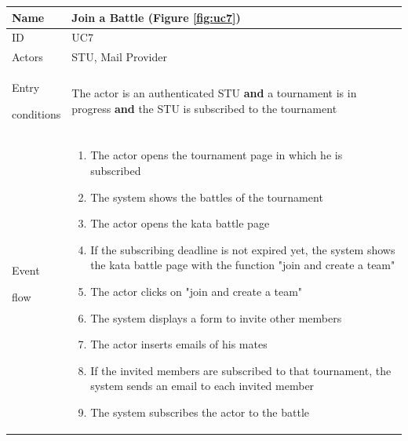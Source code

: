 \begin{center}
    \def\arraystretch{1.5}
    \begin{tabular}{| m{2cm} | m{10cm}|}
        \hline
        Name                  & Join a Battle (Figure \ref{fig:uc7})                                                                                                                             \\ \hline
        ID                    & UC7                                                                                                                                         \\ \hline
        Actors                & STU, Mail Provider                                                                                                                          \\ \hline
        Entry \par conditions & The actor is an authenticated STU \textbf{and} a tournament is in progress \textbf{and} the STU is subscribed to the tournament             \\ \hline
        Event \par flow       & \begin{enumerate}
                                    \item The actor opens the tournament page in which he is subscribed
                                    \item The system shows the battles of the tournament
                                    \item The actor opens the kata battle page
                                    \item If the subscribing deadline is not expired yet, the system shows the kata battle page with the function "join and create a team"
                                    \item The actor clicks on "join and create a team"
                                    \item The system displays a form to invite other members
                                    \item The actor inserts emails of his mates
                                    \item If the invited members are subscribed to that tournament, the system sends an email to each invited member
                                    \item The system subscribes the actor to the battle
                                \end{enumerate}       \\ \hline

\end{tabular}
\end{center}
